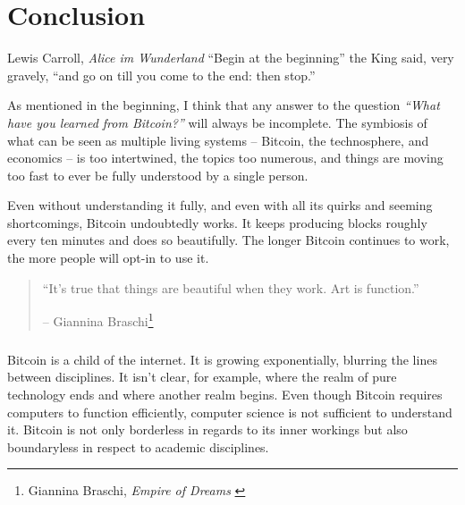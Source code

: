 \label{ch:conclusion}

\chapter*{Conclusion}

\begin{chapquote}{Lewis Carroll, \textit{Alice im Wunderland}}
\enquote{Begin at the beginning} the King said, very gravely, \enquote{and go on till you
come to the end: then stop.}
\end{chapquote}

As mentioned in the beginning, I think that any answer to the
question \textit{“What have you learned from Bitcoin?”} will always be incomplete. The
symbiosis of what can be seen as multiple living systems -- Bitcoin, the
technosphere, and economics -- is too intertwined, the topics too numerous, and
things are moving too fast to ever be fully understood by a single person.

Even without understanding it fully, and even with all its quirks and seeming
shortcomings, Bitcoin undoubtedly works. It keeps producing blocks roughly every
ten minutes and does so beautifully. The longer Bitcoin continues to work, the
more people will opt-in to use it.

\begin{quotation}\begin{samepage}
\enquote{It's true that things are beautiful when they work. Art is function.}
\begin{flushright} -- Giannina Braschi\footnote{Giannina Braschi, \textit{Empire of Dreams} \cite{braschi2011empire}}
\end{flushright}\end{samepage}\end{quotation}

\paragraph{} Bitcoin is a child of the internet. It is growing exponentially,
blurring the lines between disciplines. It isn’t clear, for example, where the
realm of pure technology ends and where another realm begins. Even though
Bitcoin requires computers to function efficiently, computer science is not
sufficient to understand it. Bitcoin is not only borderless in regards to its
inner workings but also boundaryless in respect to academic disciplines.

